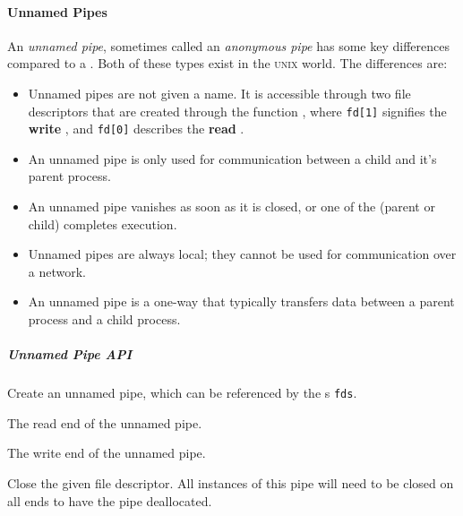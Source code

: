 \paragraph{Unnamed Pipes}\label{par:Unnamed_Pipes}
\begin{definition}\label{def:Unnamed_Pipe}
  An \emph{unnamed pipe}, sometimes called an \emph{anonymous pipe} has some key differences compared to a .
  Both of these types exist in the \textsc{unix} world.
  The differences are:
  \begin{itemize}[noitemsep]
  \item Unnamed pipes are not given a name.
    It is accessible through two file descriptors that are created through the function , where \texttt{fd[1]} signifies the \textbf{write} , and \texttt{fd[0]} describes the \textbf{read} .
  \item An unnamed pipe is only used for communication between a child and it's parent process.
  \item An unnamed pipe vanishes as soon as it is closed, or one of the  (parent or child) completes execution.
  \item Unnamed pipes are always local; they cannot be used for communication over a network.
  \item An unnamed pipe is a one-way  that typically transfers data between a parent process and a child process.
  \end{itemize}
\end{definition}

\subparagraph{Unnamed Pipe API}\label{subpar:Unnamed_Pipe_API}
\begin{description}[noitemsep]
\item[\cinline{int pipe(int fds[2])}] Create an unnamed pipe, which can be referenced by the s \texttt{fds}.
  \begin{description}[noitemsep]
  \item[\cinline{fds[0]}] The read end of the unnamed pipe.
  \item[\cinline{fds[1]}] The write end of the unnamed pipe.
  \end{description}
\item[\cinline{close(int fd)}] Close the given file descriptor.
  All instances of this pipe will need to be closed on all ends to have the pipe deallocated.
\end{description}

